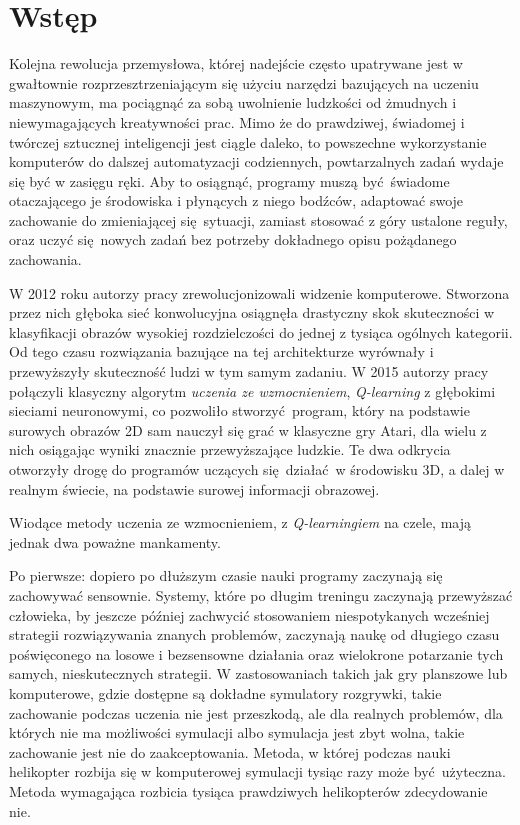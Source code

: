\chapter{Wstęp}

Kolejna rewolucja przemysłowa, której nadejście często upatrywane jest w gwałtownie rozprzesztrzeniającym się użyciu narzędzi bazujących na uczeniu maszynowym, ma pociągnąć za sobą uwolnienie ludzkości od żmudnych i niewymagających kreatywności prac. Mimo że do prawdziwej, świadomej i twórczej sztucznej inteligencji jest ciągle daleko, to powszechne wykorzystanie komputerów do dalszej automatyzacji codziennych, powtarzalnych zadań wydaje się być w zasięgu ręki. Aby to osiągnąć, programy muszą być świadome otaczającego je środowiska i płynących z niego bodźców, adaptować swoje zachowanie do zmieniającej się sytuacji, zamiast stosować z góry ustalone reguły, oraz uczyć się nowych zadań bez potrzeby dokładnego opisu pożądanego zachowania. 

W 2012 roku autorzy pracy \cite{NIPS2012_4824} zrewolucjonizowali widzenie komputerowe. Stworzona przez nich głęboka sieć konwolucyjna osiągnęła drastyczny skok skuteczności w klasyfikacji obrazów wysokiej rozdzielczości do jednej z tysiąca ogólnych kategorii. Od tego czasu rozwiązania bazujące na tej architekturze wyrównały i przewyższyły skuteczność ludzi w tym samym zadaniu. W 2015 autorzy pracy \cite{mnih2015human} połączyli klasyczny algorytm \textit{uczenia ze wzmocnieniem}, \textit{Q-learning} z głębokimi sieciami neuronowymi, co pozwoliło stworzyć program, który na podstawie surowych obrazów 2D sam nauczył się grać w klasyczne gry Atari, dla wielu z nich osiągając wyniki znacznie przewyższające ludzkie. Te dwa odkrycia otworzyły drogę do programów uczących się działać w środowisku 3D, a dalej w realnym świecie, na podstawie surowej informacji obrazowej.

Wiodące metody uczenia ze wzmocnieniem, z \textit{Q-learningiem} na czele, mają jednak dwa poważne mankamenty.

Po pierwsze: dopiero po dłuższym czasie nauki programy zaczynają się zachowywać sensownie. Systemy, które po długim treningu zaczynają przewyższać człowieka, by jeszcze później zachwycić stosowaniem niespotykanych wcześniej strategii rozwiązywania znanych problemów, zaczynają naukę od długiego czasu poświęconego na losowe i bezsensowne działania oraz wielokrone potarzanie tych samych, nieskutecznych strategii. W zastosowaniach takich jak gry planszowe lub komputerowe, gdzie dostępne są dokładne symulatory rozgrywki, takie zachowanie podczas uczenia nie jest przeszkodą, ale dla realnych problemów, dla których nie ma możliwości symulacji albo symulacja jest zbyt wolna, takie zachowanie jest nie do zaakceptowania. Metoda, w której podczas nauki helikopter rozbija się w komputerowej symulacji tysiąc razy może być użyteczna. Metoda wymagająca rozbicia tysiąca prawdziwych helikopterów zdecydowanie nie.

